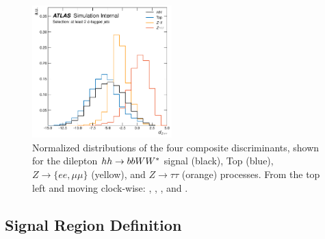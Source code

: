 \begin{figure}[!htb]
\begin{center}
        \includegraphics[width=0.48\textwidth]{figures/search_hh/nn_disc/pi_plot_NN_d_ztt}
        \caption{
            Normalized distributions of the four composite discriminants,
            shown for the dilepton
            $hh \rightarrow bbWW^*$ signal (black), Top (blue), $Z \rightarrow \{ee,\mu\mu\}$ (yellow),
            and $Z\rightarrow \tau\tau$ (orange) processes.
            From the top left and moving clock-wise: \dhh, \dtop, \dztt, and \dzsf.
        }
        \label{fig:nn_disc_d}
    \end{center}
\end{figure}

%
%

\subsection{Signal Region Definition}
\label{sec:hh_sr_def}

